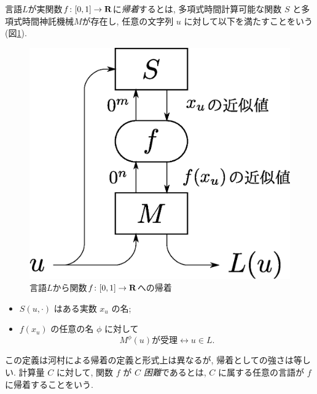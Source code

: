 \begin{definition}[帰着]
  言語$L$が実関数$f \colon [0, 1] \to \mathbf R$に\emph{帰着}するとは, 
  多項式時間計算可能な関数 $S$ と多項式時間神託機械$M$が存在し, 
  任意の文字列 $u$ に対して以下を満たすことをいう(図\ref{fig:reduction}). 
 \begin{figure}
  \begin{center}
  \includegraphics[scale=0.25]{image/reduction.eps}
  \caption{言語$L$から関数$f \colon [0,1] \to \mathbf R$への帰着}
  \label{fig:reduction}
  \end{center}
 \end{figure}
  \begin{itemize}
   \item $S(u, \cdot)$ はある実数 $x_u$ の名;
   \item $f(x_u)$ の任意の名 $\phi$ に対して
	 \[
	  M^\phi(u) \text{が受理} \leftrightarrow u \in L.
	 \]
  \end{itemize}
\end{definition}
 この定義は河村による帰着の定義と形式上は異なるが,
 帰着としての強さは等しい.
 計算量 $C$ に対して, 関数 $f$ が \emph{$C$ 困難}であるとは,
 $C$ に属する任意の言語が $f$ に帰着することをいう.
